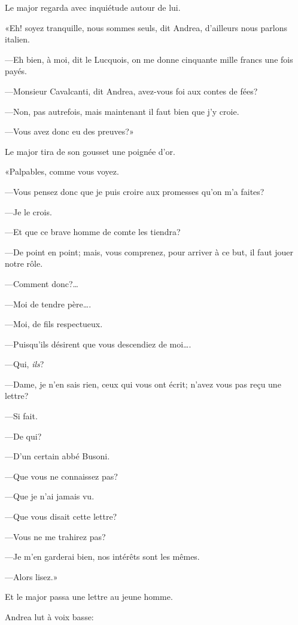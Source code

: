 Le major regarda avec inquiétude autour de lui. 

«Eh! soyez tranquille, nous sommes seuls, dit Andrea, d'ailleurs nous parlons italien. 

—Eh bien, à moi, dit le Lucquois, on me donne cinquante mille francs une fois payés. 

—Monsieur Cavalcanti, dit Andrea, avez-vous foi aux contes de fées? 

—Non, pas autrefois, mais maintenant il faut bien que j'y croie. 

—Vous avez donc eu des preuves?» 

Le major tira de son gousset une poignée d'or. 

«Palpables, comme vous voyez. 

—Vous pensez donc que je puis croire aux promesses qu'on m'a faites? 

—Je le crois. 

—Et que ce brave homme de comte les tiendra? 

—De point en point; mais, vous comprenez, pour arriver à ce but, il faut jouer notre rôle. 

—Comment donc?\dots 

—Moi de tendre père\dots. 

—Moi, de fils respectueux. 

—Puisqu'ils désirent que vous descendiez de moi\dots. 

—Qui, \textit{ils}? 

—Dame, je n'en sais rien, ceux qui vous ont écrit; n'avez vous pas reçu une lettre? 

—Si fait. 

—De qui? 

—D'un certain abbé Busoni. 

—Que vous ne connaissez pas? 

—Que je n'ai jamais vu. 

—Que vous disait cette lettre? 

—Vous ne me trahirez pas? 

—Je m'en garderai bien, nos intérêts sont les mêmes.  

—Alors lisez.» 

Et le major passa une lettre au jeune homme. 

Andrea lut à voix basse: 

